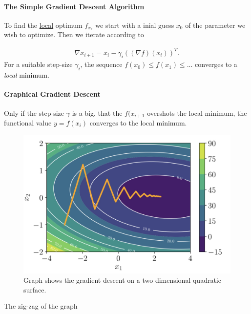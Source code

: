 \paragraph{The Simple Gradient Descent Algorithm}
To find the \underline{local} optimum $f_{x_*}$ we start with a inial guess $x_0$ of the parameter we wish to optimize. Then we iterate according to 

\begin{align}
	\nabla x_{i+1} = x_i - \gamma_i ((\nabla f)(x_i))^T.
\end{align}
For a suitable step-size $\gamma_i$, the sequence $f(x_0)\leq f(x_1) \leq ... $ converges to a \textit{local} minimum.

\paragraph{Graphical Gradient Descent}
Only if the step-size $\gamma$ is a big, that the $f(x_{i+1}$ overshots the local minimum, the functional value $y=f(x_{i})$ converges to the local minimum.

\begin{figure}[H]
	\centering
	\includegraphics[scale = 0.2]{attachment/chapter_10/Scc053}
	\caption{Graph shows the gradient descent on a two dimensional quadratic surface.}
\end{figure}


The zig-zag of the graph


